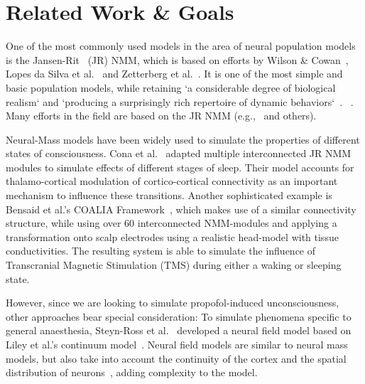 \section{Related Work \& Goals}\label{sec:related-work-and-goals}
One of the most commonly used models in the area of neural population models is the
Jansen-Rit~\cite{jansen_electroencephalogram_1995} (JR) NMM,
which is based on efforts by Wilson \& Cowan~\cite{wilson_excitatory_1972},
Lopes da Silva et al.~\cite{lopes_da_silva_model_1974, lopes_da_silva_models_1976} and
Zetterberg et al.~\cite{zetterberg_performance_1978}.
It is one of the most simple and basic population models,
while retaining `a considerable degree of biological realism` and
`producing a surprisingly rich repertoire of dynamic behaviors`~\cite{knösche_jansen-rit_2014}.
~\cite{spiegler_bifurcation_2010}.
Many efforts in the field are based on the JR NMM (e.g.,~\cite{wendling_relevance_2000, david_neural_2003,
    moran_dynamic_2009, cona_thalamo-cortical_2014, bensaid_coalia_2019} and others).

Neural-Mass models have been widely used to simulate the properties of different states of
consciousness.
Cona et al.~\cite{cona_thalamo-cortical_2014} adapted multiple interconnected JR NMM modules to simulate effects
of different stages of sleep.
Their model accounts for thalamo-cortical modulation of cortico-cortical connectivity as an important mechanism to
influence these transitions.
Another sophisticated example is Bensaid et al.'s COALIA Framework~\cite{wendling_epileptic_2002, bensaid_coalia_2019},
which makes use of a similar connectivity structure, while using over 60 interconnected NMM-modules and applying a
transformation onto scalp electrodes using a realistic head-model with tissue conductivities.
The resulting system is able to simulate the influence of Transcranial Magnetic Stimulation (TMS) during either
a waking or sleeping state.

However, since we are looking to simulate propofol-induced unconsciousness, other approaches bear special
consideration:
To simulate phenomena specific to general anaesthesia,
Steyn-Ross et al.~\cite{steyn_ross_modelling_2004, hutt_progress_2011} developed a neural field model based
on Liley et al.'s continuum model~\cite{liley_continuum_1999}.
Neural field models are similar to neural mass models,
but also take into account the continuity of the cortex and the spatial distribution of
neurons~\cite{glomb_computational_2022}, adding complexity to the model.

